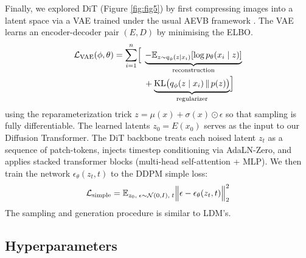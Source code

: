 \documentclass[conference]{IEEEtran}
\begin{document}
Finally, we explored DiT (Figure \ref{fig:fig5}) by first compressing images into a latent space via a VAE trained under the usual AEVB framework \cite{kingmaAutoEncodingVariationalBayes2022}. The VAE learns an encoder-decoder pair $(E, D)$ by minimising the ELBO.
\begin{equation*}
\begin{aligned}
\mathcal{L}_{\mathrm{VAE}}(\phi,\theta) = \sum_{i=1}^n \Bigl[ \;&
\underbrace{-\mathbb{E}_{z\sim q_\phi(z\mid x_i)}[\log p_\theta(x_i\mid z)]}_{\text{reconstruction}} \\
&+ \underbrace{\mathrm{KL}\bigl(q_\phi(z\mid x_i)\,\|\,p(z)\bigr)}_{\text{regularizer}}
\Bigr]
\end{aligned}
\end{equation*}
using the reparameterization trick  $z=\mu(x)+\sigma(x)\odot\epsilon$  so that sampling is fully differentiable.  The learned latents $z_0=E(x_0)$ serves as the input to our Diffusion Transformer. The DiT backbone \cite{peeblesScalableDiffusionModels2023} treats each noised latent $z_t$  as a sequence of patch-tokens, injects timestep conditioning via AdaLN-Zero, and applies stacked transformer blocks (multi-head self-attention + MLP). We then train the network $\epsilon_\theta(z_t,t)$ to the DDPM simple loss:
$$
\mathcal{L}_{\mathrm{simple}}= \mathbb{E}_{z_0,\;\epsilon\sim\mathcal{N}(0,I),\;t}\Bigl\|\epsilon - \epsilon_\theta(z_t,t)\Bigr\|_2^2
$$
The sampling and generation procedure is similar to LDM’s.

\subsection{Hyperparameters}\label{hyperparameters}
\end{document}

